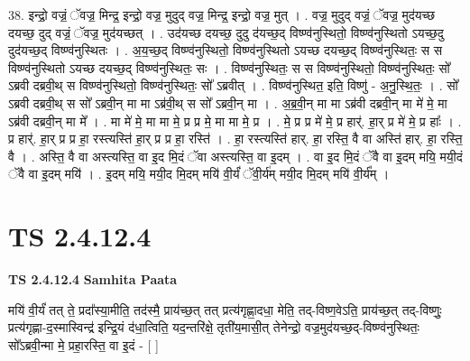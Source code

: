\documentclass[17pt]{extarticle}
\begin{document}
38. इन्द्रो॒ वज्रं॒ ॅवज्र॒ मिन्द्र॒ इन्द्रो॒ वज्र॒ मुदुद् वज्र॒ मिन्द्र॒ इन्द्रो॒ वज्र॒ मुत् । . वज्र॒ मुदुद् वज्रं॒ ॅवज्र॒ मुद॑यच्छ दयच्छ॒ दुद् वज्रं॒ ॅवज्र॒ मुद॑यच्छत् । . उद॑यच्छ दयच्छ॒ दुदु द॑यच्छ॒द् विष्ण्व॑नुस्थितो॒ विष्ण्व॑नुस्थितो ऽयच्छ॒दु दुद॑यच्छ॒द् विष्ण्व॑नुस्थितः । . अ॒य॒च्छ॒द् विष्ण्व॑नुस्थितो॒ विष्ण्व॑नुस्थितो ऽयच्छ दयच्छ॒द् विष्ण्व॑नुस्थितः॒ स स विष्ण्व॑नुस्थितो ऽयच्छ दयच्छ॒द् विष्ण्व॑नुस्थितः॒ सः । . विष्ण्व॑नुस्थितः॒ स स विष्ण्व॑नुस्थितो॒ विष्ण्व॑नुस्थितः॒ सो᳚ ऽब्रवी दब्रवी॒थ् स विष्ण्व॑नुस्थितो॒ विष्ण्व॑नुस्थितः॒ सो᳚ ऽब्रवीत् । . विष्ण्व॑नुस्थित॒ इति॒ विष्णु॑ - अ॒नु॒स्थि॒तः॒ । . सो᳚ ऽब्रवी दब्रवी॒थ् स सो᳚ ऽब्रवी॒न् मा मा ऽब्र॑वी॒थ् स सो᳚ ऽब्रवी॒न् मा । . अ॒ब्र॒वी॒न् मा मा ऽब्र॑वी दब्रवी॒न् मा मे॑ मे॒ मा ऽब्र॑वी दब्रवी॒न् मा मे᳚ । . मा मे॑ मे॒ मा मा मे॒ प्र प्र मे॒ मा मा मे॒ प्र । . मे॒ प्र प्र मे॑ मे॒ प्र हार्॑. हा॒र् प्र मे॑ मे॒ प्र हाः᳚ । . प्र हार्॑. हा॒र् प्र प्र हा॒ रस्त्यस्ति॑ हा॒र् प्र प्र हा॒ रस्ति॑ । . हा॒ रस्त्यस्ति॑ हार्. हा॒ रस्ति॒ वै वा अस्ति॑ हार्. हा॒ रस्ति॒ वै । . अस्ति॒ वै वा अस्त्यस्ति॒ वा इ॒द मि॒दं ॅवा अस्त्यस्ति॒ वा इ॒दम् । . वा इ॒द मि॒दं ॅवै वा इ॒दम् मयि॒ मयी॒दं ॅवै वा इ॒दम् मयि॑ । . इ॒दम् मयि॒ मयी॒द मि॒दम् मयि॑ वी॒र्यं॑ ॅवी॒र्य॑म् मयी॒द मि॒दम् मयि॑ वी॒र्य᳚म् । \newline
\pagebreak
{}

\section{ TS 2.4.12.4 }

\textbf{TS 2.4.12.4 } \newline
\textbf{Samhita Paata} \newline

मयि॑ वी॒र्यं॑ तत् ते॒ प्रदा᳚स्या॒मीति॒ तद॑स्मै॒ प्राय॑च्छ॒त् तत् प्रत्य॑गृह्णा॒दधा॒ मेति॒ तद्-विष्ण॒वेऽति॒ प्राय॑च्छ॒त् तद्-विष्णुः॒ प्रत्य॑गृह्णा-द॒स्मास्विन्द्र॑ इन्द्रि॒यं द॑धा॒त्विति॒ यद॒न्तरि॑क्षे॒ तृती॑य॒मासी॒त् तेनेन्द्रो॒ वज्र॒मुद॑यच्छ॒द्-विष्ण्व॑नुस्थितः॒ सो᳚ऽब्रवी॒न्मा मे॒ प्रहा॒रस्ति॒ वा इ॒दं - [  ] \newline
\end{document}
